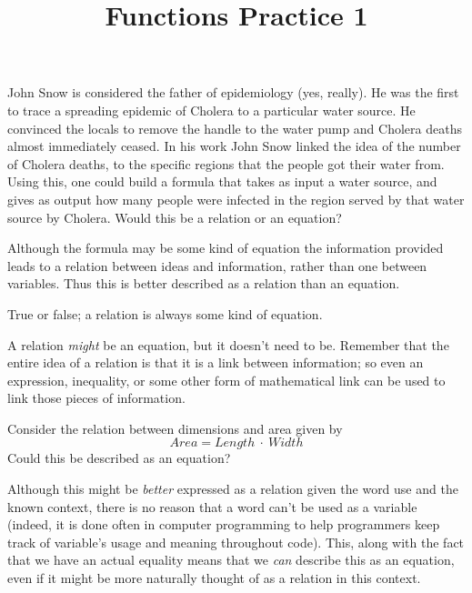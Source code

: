 \documentclass{ximera}
\title{Functions Practice 1}
\begin{document}
%

\begin{problem}
    John Snow is considered the father of epidemiology (yes, really). He was the first to trace a spreading epidemic of Cholera to a particular water source. He convinced the locals to remove the handle to the water pump and Cholera deaths almost immediately ceased. In his work John Snow linked the idea of the number of Cholera deaths, to the specific regions that the people got their water from. Using this, one could build a formula that takes as input a water source, and gives as output how many people were infected in the region served by that water source by Cholera. Would this be a relation or an equation?
    
    \begin{multipleChoice}
    \end{multipleChoice}
    \begin{feedback}
        Although the formula may be some kind of equation the information provided leads to a relation between ideas and information, rather than one between variables. Thus this is better described as a relation than an equation.
    \end{feedback}
\end{problem}

\begin{problem}
    True or false; a relation is always some kind of equation.
    \begin{multipleChoice}
    \end{multipleChoice}
    \begin{feedback}
        A relation \textit{might} be an equation, but it doesn't need to be. Remember that the entire idea of a relation is that it is a link between information; so even an expression, inequality, or some other form of mathematical link can be used to link those pieces of information.
    \end{feedback}
\end{problem}
\begin{problem}
    Consider the relation between dimensions and area given by
    \[
        Area = Length \ \cdot \ Width
    \]
    Could this be described as an equation?
    \begin{multipleChoice}
    \end{multipleChoice}
    \begin{feedback}
        Although this might be \textit{better} expressed as a relation given the word use and the known context, there is no reason that a word can't be used as a variable (indeed, it is done often in computer programming to help programmers keep track of variable's usage and meaning throughout code). This, along with the fact that we have an actual equality means that we \textit{can} describe this as an equation, even if it might be more naturally thought of as a relation in this context.
    \end{feedback}
\end{problem}
\end{document}
